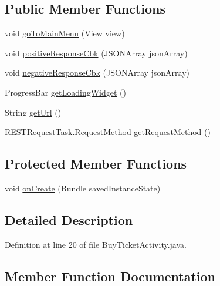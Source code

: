 \subsection*{Public Member Functions}
\begin{DoxyCompactItemize}
\item 
void \hyperlink{classcom_1_1bartekcios_1_1ticketsclient_1_1_buy_ticket_activity_ad31cd374ed89897aedc4ceb5dfc749be}{go\+To\+Main\+Menu} (View view)
\item 
void \hyperlink{classcom_1_1bartekcios_1_1ticketsclient_1_1_buy_ticket_activity_a9b1bc6b8adc4010019ce154dab685ae3}{positive\+Response\+Cbk} (J\+S\+O\+N\+Array json\+Array)
\item 
void \hyperlink{classcom_1_1bartekcios_1_1ticketsclient_1_1_buy_ticket_activity_ab07afd1227834ee2ca9e4a27db9325d0}{negative\+Response\+Cbk} (J\+S\+O\+N\+Array json\+Array)
\item 
Progress\+Bar \hyperlink{classcom_1_1bartekcios_1_1ticketsclient_1_1_buy_ticket_activity_a72eb609d70c9934ed8c218284eec41b8}{get\+Loading\+Widget} ()
\item 
String \hyperlink{classcom_1_1bartekcios_1_1ticketsclient_1_1_buy_ticket_activity_a508922389c8768aa14a5da8645865aec}{get\+Url} ()
\item 
R\+E\+S\+T\+Request\+Task.\+Request\+Method \hyperlink{classcom_1_1bartekcios_1_1ticketsclient_1_1_buy_ticket_activity_af45059ee41a02275e858584b518a8942}{get\+Request\+Method} ()
\end{DoxyCompactItemize}
\subsection*{Protected Member Functions}
\begin{DoxyCompactItemize}
\item 
void \hyperlink{classcom_1_1bartekcios_1_1ticketsclient_1_1_buy_ticket_activity_aae59e45725fb5840716e0ddcce2b88e3}{on\+Create} (Bundle saved\+Instance\+State)
\end{DoxyCompactItemize}


\subsection{Detailed Description}


Definition at line 20 of file Buy\+Ticket\+Activity.\+java.



\subsection{Member Function Documentation}
\mbox{\label{classcom_1_1bartekcios_1_1ticketsclient_1_1_buy_ticket_activity_a72eb609d70c9934ed8c218284eec41b8}} 
